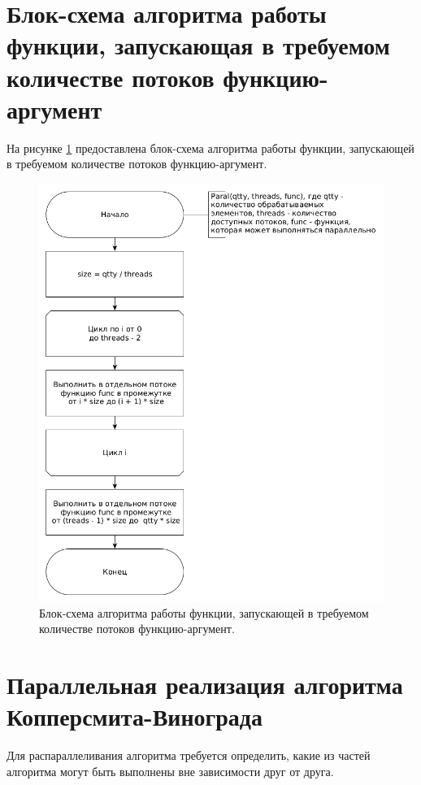 \documentclass[12pt]{report}
\begin{document}
\section{Блок-схема алгоритма работы функции, запускающая в требуемом количестве потоков функцию-аргумент}
На рисунке \ref{img:paralFuck} предоставлена блок-схема алгоритма работы функции, запускающей в требуемом количестве потоков функцию-аргумент.

\begin{figure}
\begin{center}
\includegraphics[scale=0.3]{inc/img/paralFunc.png}
\captionsetup{justification=centering}
	\caption{Блок-схема алгоритма работы функции, запускающей в требуемом количестве потоков функцию-аргумент.}
	\label{img:paralFuck}	
\end{center}
\end{figure}

\section{Параллельная реализация алгоритма Копперсмита-Винограда}
Для распараллеливания алгоритма требуется определить, какие из частей алгоритма могут быть выполнены вне зависимости друг от друга.
\end{document}
